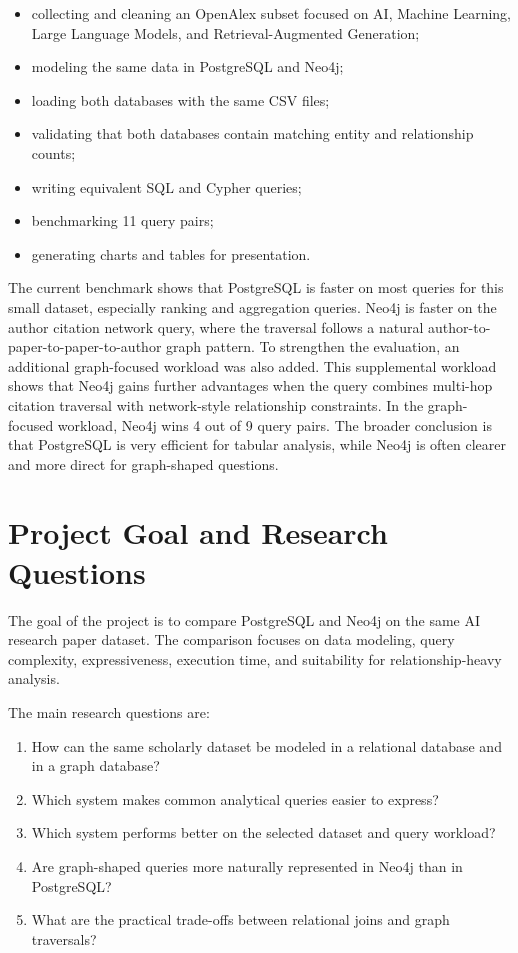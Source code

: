 \documentclass[11pt]{article}
\begin{document}
\begin{itemize}
    \item collecting and cleaning an OpenAlex subset focused on AI, Machine Learning, Large Language Models, and Retrieval-Augmented Generation;
    \item modeling the same data in PostgreSQL and Neo4j;
    \item loading both databases with the same CSV files;
    \item validating that both databases contain matching entity and relationship counts;
    \item writing equivalent SQL and Cypher queries;
    \item benchmarking 11 query pairs;
    \item generating charts and tables for presentation.
\end{itemize}

The current benchmark shows that PostgreSQL is faster on most queries for this small dataset, especially ranking and aggregation queries.
Neo4j is faster on the author citation network query, where the traversal follows a natural author-to-paper-to-paper-to-author graph pattern.
To strengthen the evaluation, an additional graph-focused workload was also added.
This supplemental workload shows that Neo4j gains further advantages when the query combines multi-hop citation traversal with network-style relationship constraints.
In the graph-focused workload, Neo4j wins 4 out of 9 query pairs.
The broader conclusion is that PostgreSQL is very efficient for tabular analysis, while Neo4j is often clearer and more direct for graph-shaped questions.

\section{Project Goal and Research Questions}

The goal of the project is to compare PostgreSQL and Neo4j on the same AI research paper dataset.
The comparison focuses on data modeling, query complexity, expressiveness, execution time, and suitability for relationship-heavy analysis.

The main research questions are:

\begin{enumerate}
    \item How can the same scholarly dataset be modeled in a relational database and in a graph database?
    \item Which system makes common analytical queries easier to express?
    \item Which system performs better on the selected dataset and query workload?
    \item Are graph-shaped queries more naturally represented in Neo4j than in PostgreSQL?
    \item What are the practical trade-offs between relational joins and graph traversals?
\end{enumerate}
\end{document}

